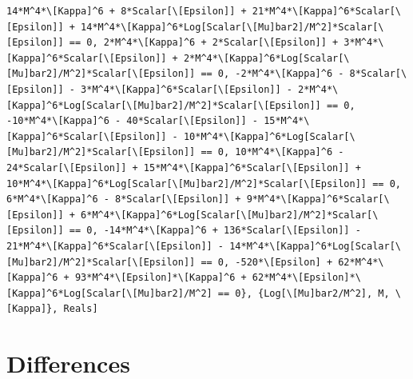 \documentclass[11pt]{article}
\begin{document}
\begin{verbatim}
14*M^4*\[Kappa]^6 + 8*Scalar[\[Epsilon]] + 21*M^4*\[Kappa]^6*Scalar[\[Epsilon]] + 14*M^4*\[Kappa]^6*Log[Scalar[\[Mu]bar2]/M^2]*Scalar[\[Epsilon]] == 0, 2*M^4*\[Kappa]^6 + 2*Scalar[\[Epsilon]] + 3*M^4*\[Kappa]^6*Scalar[\[Epsilon]] + 2*M^4*\[Kappa]^6*Log[Scalar[\[Mu]bar2]/M^2]*Scalar[\[Epsilon]] == 0, -2*M^4*\[Kappa]^6 - 8*Scalar[\[Epsilon]] - 3*M^4*\[Kappa]^6*Scalar[\[Epsilon]] - 2*M^4*\[Kappa]^6*Log[Scalar[\[Mu]bar2]/M^2]*Scalar[\[Epsilon]] == 0, -10*M^4*\[Kappa]^6 - 40*Scalar[\[Epsilon]] - 15*M^4*\[Kappa]^6*Scalar[\[Epsilon]] - 10*M^4*\[Kappa]^6*Log[Scalar[\[Mu]bar2]/M^2]*Scalar[\[Epsilon]] == 0, 10*M^4*\[Kappa]^6 - 24*Scalar[\[Epsilon]] + 15*M^4*\[Kappa]^6*Scalar[\[Epsilon]] + 10*M^4*\[Kappa]^6*Log[Scalar[\[Mu]bar2]/M^2]*Scalar[\[Epsilon]] == 0, 6*M^4*\[Kappa]^6 - 8*Scalar[\[Epsilon]] + 9*M^4*\[Kappa]^6*Scalar[\[Epsilon]] + 6*M^4*\[Kappa]^6*Log[Scalar[\[Mu]bar2]/M^2]*Scalar[\[Epsilon]] == 0, -14*M^4*\[Kappa]^6 + 136*Scalar[\[Epsilon]] - 21*M^4*\[Kappa]^6*Scalar[\[Epsilon]] - 14*M^4*\[Kappa]^6*Log[Scalar[\[Mu]bar2]/M^2]*Scalar[\[Epsilon]] == 0, -520*\[Epsilon] + 62*M^4*\[Kappa]^6 + 93*M^4*\[Epsilon]*\[Kappa]^6 + 62*M^4*\[Epsilon]*\[Kappa]^6*Log[Scalar[\[Mu]bar2]/M^2] == 0}, {Log[\[Mu]bar2/M^2], M, \[Kappa]}, Reals]
\end{verbatim}
\section{Differences}
\end{document}
